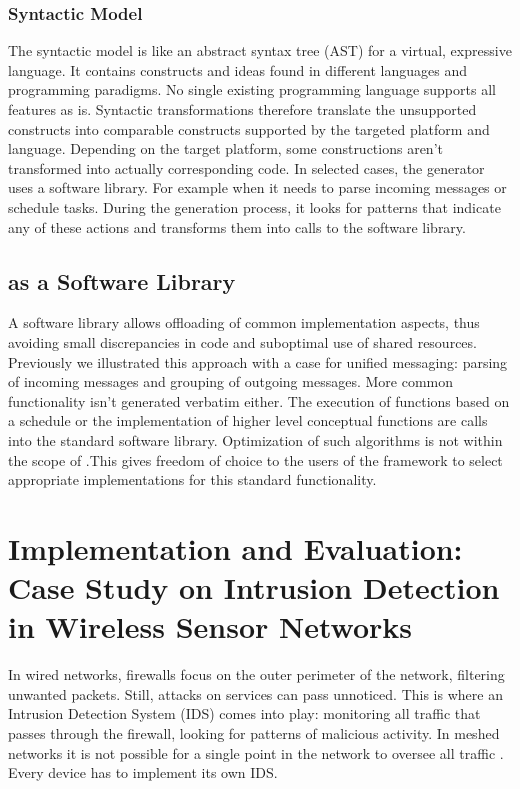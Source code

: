 \documentclass[3p,times,procedia]{elsarticle}
\begin{document}
\vspace{-1mm}
\subsubsection{Syntactic Model}

The syntactic model is like an abstract syntax tree (AST) for a virtual,
expressive language. It contains constructs and ideas found in different
languages and programming paradigms. No single existing programming language
supports all features as is. Syntactic transformations therefore translate the
unsupported constructs into comparable constructs supported by the targeted
platform and language. Depending on the target platform, some constructions
aren't transformed into actually corresponding code. In selected cases, the
generator uses a software library. For example when it needs to parse incoming
messages or schedule tasks. During the generation process, it looks for
patterns that indicate any of these actions and transforms them into calls to
the \FOO software library.

\vspace{-1mm}
\subsection{\FOO as a Software Library}
\label{software-lib-design}

A software library allows offloading of common implementation aspects, thus
avoiding small discrepancies in code and suboptimal use of shared resources.
Previously we illustrated this approach with a case for unified messaging:
parsing of incoming messages and grouping of outgoing messages. More common
functionality isn't generated verbatim either. The execution of functions based
on a schedule or the implementation of higher level conceptual functions are
calls into the standard software library. Optimization of such algorithms is
not within the scope of \FOO.\@ This gives freedom of choice to the users of
the framework to select appropriate implementations for this standard
functionality.

\section{Implementation and Evaluation: Case Study on Intrusion Detection in Wireless Sensor Networks}
\label{evaluation}

In wired networks, firewalls focus on the outer perimeter of the network,
filtering unwanted packets. Still, attacks on services can pass unnoticed. This
is where an Intrusion Detection System (IDS) comes into play: monitoring all
traffic that passes through the firewall, looking for patterns of malicious
activity\cite{denning1987intrusion}. In meshed networks it is not possible for
a single point in the network to oversee all traffic
\cite{mishra2004intrusion}. Every device has to implement its own IDS.
\end{document}
